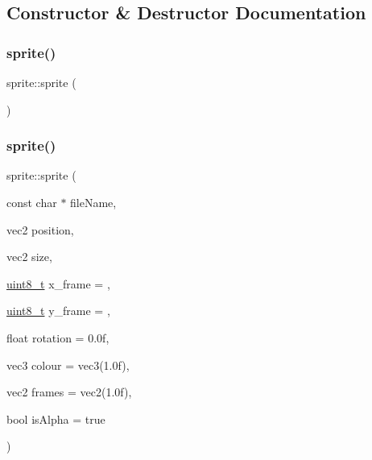 \subsection{Constructor \& Destructor Documentation}
\mbox{\label{classsprite_ab301a52437b1fedba953a3a3003d3a0d}} 
\subsubsection{\texorpdfstring{sprite()}{sprite()}\hspace{0.1cm}{\footnotesize\ttfamily [1/2]}}
{\footnotesize\ttfamily sprite\+::sprite (\begin{DoxyParamCaption}{ }\end{DoxyParamCaption})\hspace{0.3cm}{\ttfamily [inline]}}

\mbox{\label{classsprite_a4eb7fd55561401ee6765aae2ff18433d}} 
\subsubsection{\texorpdfstring{sprite()}{sprite()}\hspace{0.1cm}{\footnotesize\ttfamily [2/2]}}
{\footnotesize\ttfamily sprite\+::sprite (\begin{DoxyParamCaption}\item[{const char $\ast$}]{file\+Name,  }\item[{vec2}]{position,  }\item[{vec2}]{size,  }\item[{\hyperlink{stdint_8h_aba7bc1797add20fe3efdf37ced1182c5}{uint8\+\_\+t}}]{x\+\_\+frame = {},  }\item[{\hyperlink{stdint_8h_aba7bc1797add20fe3efdf37ced1182c5}{uint8\+\_\+t}}]{y\+\_\+frame = {},  }\item[{float}]{rotation = {\ttfamily 0.0f},  }\item[{vec3}]{colour = {\ttfamily vec3(1.0f)},  }\item[{vec2}]{frames = {\ttfamily vec2(1.0f)},  }\item[{bool}]{is\+Alpha = {\ttfamily true} }\end{DoxyParamCaption})}

\mbox{\label{classsprite_aa2c57852113368003657c673e39b6f3a}} 
